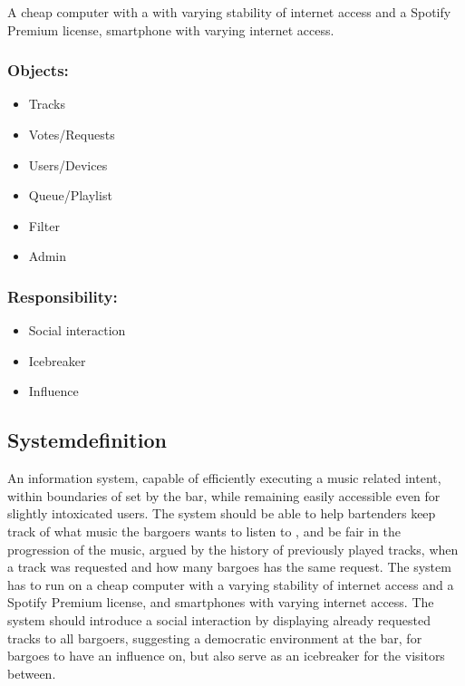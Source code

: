 A cheap computer with a with varying stability of internet access and a Spotify Premium license, smartphone with varying internet access.

\subsubsection{Objects:}
\begin{itemize}
    \item Tracks
    \item Votes/Requests
    \item Users/Devices
    \item Queue/Playlist
    \item Filter
    \item Admin
\end{itemize}


\subsubsection{Responsibility:}
\begin{itemize}
    \item Social interaction
    \item Icebreaker
    \item Influence
\end{itemize}

\subsection{Systemdefinition}

An information system, capable of efficiently executing a music related intent, within boundaries of set by the bar, while remaining easily accessible even for slightly intoxicated users.  The system should be able to help bartenders keep track of what music the bargoers wants to listen to , and be fair in the progression of the music, argued by the history of previously played tracks, when a track was requested and how many bargoes has the same request. The system has to run on a cheap computer with a varying stability of internet access and a Spotify Premium license, and smartphones with varying internet access. The system should introduce a social interaction by displaying already requested tracks to all bargoers, suggesting a democratic environment at the bar, for bargoes to have an influence on, but also serve as an icebreaker for the visitors between.
